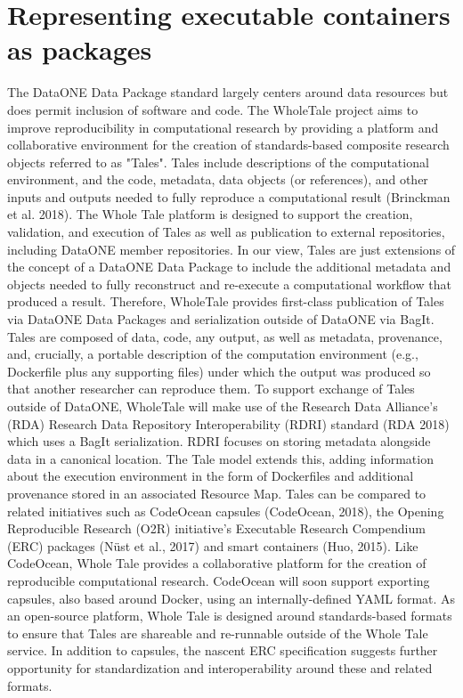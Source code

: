 \documentclass[conference]{IEEEtran}
\begin{document}
\section{Representing executable containers as packages}

The DataONE Data Package standard largely centers around data resources but does permit inclusion of software and code.
The WholeTale project aims to improve reproducibility in computational research by providing a platform and collaborative environment for the creation of standards-based composite research objects referred to as "Tales".
Tales include descriptions of the computational environment, and the code, metadata, data objects (or references), and other inputs and outputs needed to fully reproduce a computational result (Brinckman et al. 2018).
The Whole Tale platform is designed to support the creation, validation, and execution of Tales as well as publication to external repositories, including DataONE member repositories.
In our view, Tales are just extensions of the concept of a DataONE Data Package to include the additional metadata and objects needed to fully reconstruct and re-execute a computational workflow that produced a result.
Therefore, WholeTale provides first-class publication of Tales via DataONE Data Packages and serialization outside of DataONE via BagIt.
Tales are composed of data, code, any output, as well as metadata, provenance, and, crucially, a portable description of the computation environment (e.g., Dockerfile plus any supporting files) under which the output was produced so that another researcher can reproduce them.
To support exchange of Tales outside of DataONE, WholeTale will make use of the Research Data Alliance’s (RDA) Research Data Repository Interoperability (RDRI) standard (RDA 2018) which uses a BagIt serialization.
RDRI focuses on storing metadata alongside data in a canonical location.
The Tale model extends this, adding information about the execution environment in the form of Dockerfiles and additional provenance stored in an associated Resource Map.
Tales can be compared to related initiatives such as CodeOcean capsules (CodeOcean, 2018), the Opening Reproducible Research (O2R) initiative's Executable Research Compendium (ERC) packages (Nüst et al., 2017) and smart containers (Huo, 2015).
Like CodeOcean, Whole Tale provides a collaborative platform for the creation of reproducible computational research.
CodeOcean will soon support exporting capsules, also based around Docker, using an internally-defined YAML format.
As an open-source platform, Whole Tale is designed around standards-based formats to ensure that Tales are shareable and re-runnable outside of the Whole Tale service.
In addition to capsules, the nascent ERC specification suggests further opportunity for standardization and interoperability around these and related formats.
\end{document}
